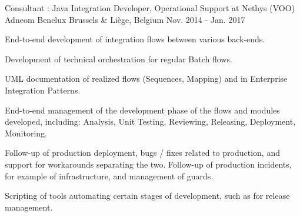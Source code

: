 \begin{cventries}
  \cventry
    {Consultant : Java Integration Developer, Operational Support at Nethys (VOO)} %
    {Adneom Benelux} %
    {Brussels \& Liège, Belgium} %
    {Nov. 2014 - Jan. 2017} %
    {
      \begin{cvitems} %
        \item {End-to-end development of integration flows between various back-ends.}
        \item {Development of technical orchestration for regular Batch flows.}
        \item {UML documentation of realized flows (Sequences, Mapping) and in Enterprise Integration Patterns.}
        \item {End-to-end management of the development phase of the flows and modules developed, including: Analysis, Unit Testing, Reviewing, Releasing, Deployment, Monitoring.}
        \item {Follow-up of production deployment, bugs / fixes related to production, and support for workarounds separating the two. Follow-up of production incidents, for example of infrastructure, and management of guards.}
        \item {Scripting of tools automating certain stages of development, such as for release management.}
      \end{cvitems}
    }


\end{cventries}
